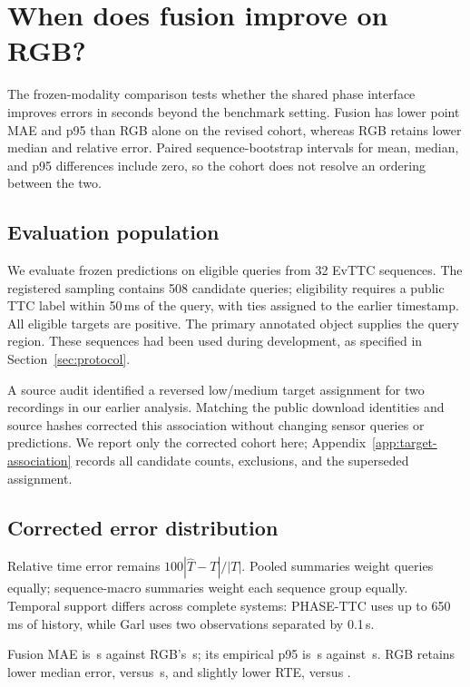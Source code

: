 \section{When does fusion improve on RGB?}
\label{sec:late-transfer}

The frozen-modality comparison tests whether the shared phase interface improves errors in seconds beyond the benchmark setting. Fusion has lower point MAE and p95 than RGB alone on the revised cohort, whereas RGB retains lower median and relative error. Paired sequence-bootstrap intervals for mean, median, and p95 differences include zero, so the cohort does not resolve an ordering between the two.

\subsection{Evaluation population}
We evaluate frozen predictions on \AuditTransferCount{} eligible queries from 32 EvTTC sequences. The registered sampling contains 508 candidate queries; eligibility requires a public TTC label within 50\,ms of the query, with ties assigned to the earlier timestamp. All eligible targets are positive. The primary annotated object supplies the query region. These sequences had been used during development, as specified in Section~\ref{sec:protocol}.

A source audit identified a reversed low/medium target assignment for two recordings in our earlier analysis. Matching the public download identities and source hashes corrected this association without changing sensor queries or predictions. We report only the corrected cohort here; Appendix~\ref{app:target-association} records all candidate counts, exclusions, and the superseded assignment.

\subsection{Corrected error distribution}
Relative time error remains $100|\widehat T-T|/|T|$. Pooled summaries weight queries equally; sequence-macro summaries weight each sequence group equally. Temporal support differs across complete systems: PHASE-TTC uses up to 650\,ms of history, while Garl uses two observations separated by 0.1\,s.



Fusion MAE is \AuditFusionMAE{}\,s against RGB's \AuditRgbMAE{}\,s; its empirical p95 is \AuditFusionPninetyfive{}\,s against \AuditRgbPninetyfive{}\,s. RGB retains lower median error, \AuditRgbMedian{} versus \AuditFusionMedian{}\,s, and slightly lower RTE, \AuditRgbRTE{} versus \AuditFusionRTE{}.  



